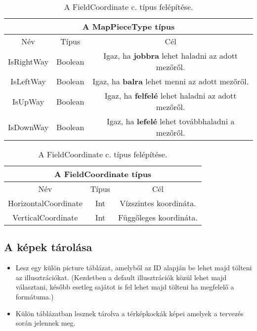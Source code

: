 \begin{table}[H]
	\centering
	\begin{tabular}{ |c|c|c| }
		\hline
		\multicolumn{3}{|c|}{A MapPieceType típus}\\
		\hline
		Név & Típus & Cél \\
		\hline
		IsRightWay  & Boolean  & Igaz, ha \textbf{jobbra} lehet haladni az adott mezőről.  \\
		\hline
		IsLeftWay & Boolean & Igaz, ha \textbf{balra} lehet menni az adott mezőről.\\
		\hline
		IsUpWay & Boolean & Igaz, ha \textbf{felfelé} lehet haladni az adott mezőről.\\
		\hline
		IsDownWay & Boolean & Igaz, ha \textbf{lefelé} lehet továbbhaladni a mezőről.\\
		\hline
	\end{tabular}
	\caption[FielCoordinate típus]{A FieldCoordinate c. típus felépítése.}
	\label{tab:field}
\end{table}

\begin{table}[H]
	\centering
	\begin{tabular}{ |c|c|c| }
		\hline
		\multicolumn{3}{|c|}{A FieldCoordinate típus}\\
		\hline
		Név & Típus & Cél \\
		\hline
		HorizontalCoordinate  & Int  & Vízszintes koordináta.  \\
		\hline
		VerticalCoordinate & Int &Függőleges koordináta.\\
		\hline
	\end{tabular}
	\caption[FielCoordinate típus]{A FieldCoordinate c. típus felépítése.}
	\label{tab:field}
\end{table}

\subsection{A képek tárolása}

\begin{itemize}
	\item Lesz egy külön picture táblázat, amelyből az ID alapján be lehet majd tölteni az illusztrációkat. (Kezdetben a default illusztrációk közül lehet majd választani, később esetleg sajátot is fel lehet majd tölteni ha megfelelő a formátuma.)
	
	\item Külön táblázatban lesznek tárolva a térképkockák képei amelyek a tervezés során jelennek meg.
\end{itemize}

